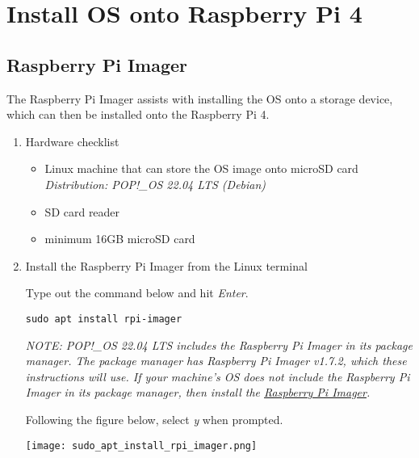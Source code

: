 \documentclass[journal]{IEEEtran}
\begin{document}
    \appendices
    \section{Install OS onto Raspberry Pi 4}
    \subsection{Raspberry Pi Imager}

    The Raspberry Pi Imager assists with installing the OS onto a storage device, which can then be installed onto the Raspberry Pi 4.

    \begin{enumerate}
        \item Hardware checklist
        
        \begin{itemize}
            \item Linux machine that can store the OS image onto microSD card \newline
                \emph{Distribution: POP!\_OS 22.04 LTS (Debian)}
            \item SD card reader
            \item minimum 16GB microSD card
        \end{itemize}
    
        \item Install the Raspberry Pi Imager from the Linux terminal \newline
        
        Type out the command below and hit \emph{Enter}. \newline

        \begin{lstlisting}[frame=single]
            sudo apt install rpi-imager
        \end{lstlisting}

        \emph{NOTE: POP!\_OS 22.04 LTS includes the Raspberry Pi Imager in its package manager. The package manager has Raspberry Pi Imager v1.7.2, which these instructions will use. If your machine's OS does not include the Raspberry Pi Imager in its package manager, then install the {\href{https://www.raspberrypi.com/software/}{Raspberry Pi Imager}}.} \newline

        Following the figure below, select \emph{y} when prompted. \newline

        \texttt{[image: sudo\_apt\_install\_rpi\_imager.png]}


\end{enumerate}
\end{document}
